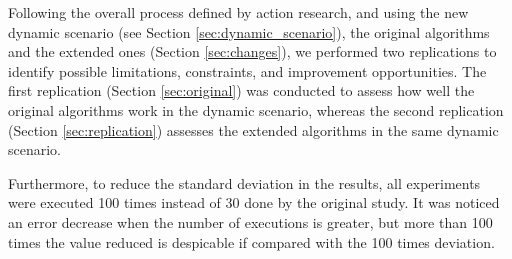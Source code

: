 Following the overall process defined by action research, and using the new dynamic scenario (see Section \ref{sec:dynamic_scenario}), the original algorithms and the extended ones (Section \ref{sec:changes}), we performed two replications to identify possible limitations, constraints, and improvement opportunities. The first replication (Section \ref{sec:original}) was conducted to assess how well the original algorithms work in the dynamic scenario, whereas the second replication (Section \ref{sec:replication}) assesses the extended algorithms in the same dynamic scenario.

Furthermore, to reduce the standard deviation in the results, all experiments were executed 100 times instead of 30 done by the original study. It was noticed an error decrease when the number of executions is greater, but more than 100 times the value reduced is despicable if compared with the 100 times deviation.

